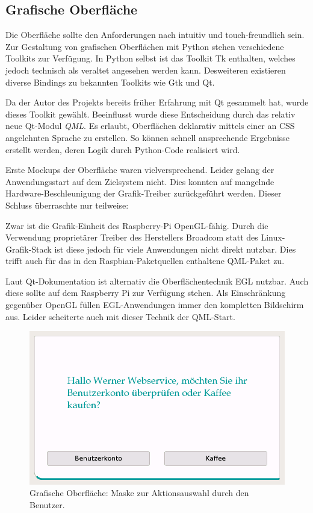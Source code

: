 \documentclass[11pt,a4paper]{IEEEtran}
\begin{document}
\subsection{Grafische Oberfläche} 
\label{sec:gui}

Die Oberfläche sollte den Anforderungen nach intuitiv und touch-freundlich
sein. Zur Gestaltung von grafischen Oberflächen mit Python stehen verschiedene
Toolkits zur Verfügung. In Python selbst ist das Toolkit Tk enthalten, welches
jedoch technisch als veraltet angesehen werden kann. Desweiteren existieren
diverse Bindings zu bekannten Toolkits wie Gtk und Qt. 

Da der Autor des Projekts bereits früher Erfahrung mit Qt gesammelt hat, wurde 
dieses Toolkit gewählt. Beeinflusst wurde diese Entscheidung durch das relativ
neue Qt-Modul \emph{QML}. Es erlaubt, Oberflächen deklarativ mittels einer an
CSS angelehnten Sprache zu erstellen. So können schnell ansprechende Ergebnisse
erstellt werden, deren Logik durch Python-Code realisiert wird.

Erste Mockups der Oberfläche waren vielversprechend. Leider gelang der 
Anwendungsstart auf dem Zielsystem nicht. Dies konnten auf mangelnde 
Hardware-Beschleunigung der Grafik-Treiber zurückgeführt werden. Dieser Schluss
überraschte nur teilweise: 

Zwar ist die Grafik-Einheit des Raspberry-Pi OpenGL-fähig. Durch die Verwendung
proprietärer Treiber des Herstellers Broadcom statt des Linux-Grafik-Stack ist
diese jedoch für viele Anwendungen nicht direkt nutzbar. Dies trifft auch für
das in den Raspbian-Paketquellen enthaltene QML-Paket zu.

Laut Qt-Dokumentation ist alternativ die Oberflächentechnik EGL nutzbar. Auch
diese sollte auf dem Raspberry Pi zur Verfügung stehen. Als Einschränkung 
gegenüber OpenGL füllen EGL-Anwendungen immer den kompletten Bildschirm aus.
Leider scheiterte auch mit dieser Technik der QML-Start.

\begin{figure}[htb]
    \label{fig:qt}
    \centering
    \includegraphics[width=.9\columnwidth]{images/screenshot}
    \caption{Grafische Oberfläche: Maske zur Aktionsauswahl durch den Benutzer.}
\end{figure}
\end{document}
